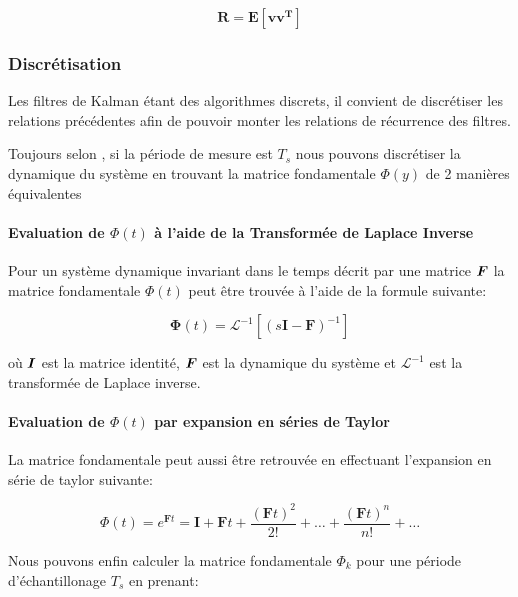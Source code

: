 \documentclass[12pt,a4paper]{report}
\begin{document}
	\begin{equation}
		\label{eq:covmesur_cont}
		\boldsymbol{R = E[vv^T]}
	\end{equation}
	
	\subsubsection{Discrétisation}
	Les filtres de Kalman étant des algorithmes discrets, il convient de discrétiser les relations précédentes afin de pouvoir monter les relations de récurrence des filtres.
	
	\para Toujours selon \cite{zarchan_fundamentals_2009}, si la période de mesure est $T_s$ nous pouvons discrétiser la dynamique du système en trouvant la matrice fondamentale $\Phi(y)$ de 2 manières équivalentes
	
	\paragraph*{Evaluation de $\Phi(t)$ à l'aide de la Transformée de Laplace Inverse}
	
	\para Pour un système dynamique invariant dans le temps décrit par une matrice $\boldsymbol{F}$ la matrice fondamentale $\Phi(t)$ peut être trouvée à l'aide de la formule suivante:
	
	\begin{equation}
	\boldsymbol \Phi(t) =  \mathcal{L}^{-1}[(s\boldsymbol{I-F})^{-1}]
	\end{equation}
	
	\para où $\boldsymbol{I}$ est la matrice identité, $\boldsymbol{F}$ est la dynamique du système et $\mathcal{L}^{-1}$ est la transformée de Laplace inverse.
	
	\paragraph*{Evaluation de $\Phi(t)$ par expansion en séries de Taylor}
	\para La matrice fondamentale peut aussi être retrouvée en effectuant l'expansion en série de taylor suivante:
	
	\begin{equation}
	 \Phi(t) = e^{\boldsymbol Ft} = \boldsymbol I + \boldsymbol Ft + \frac{(\boldsymbol Ft)^2}{2!} + \dots + \frac{(\boldsymbol Ft)^n}{n!} + \dots
	\end{equation}
	
	\para Nous pouvons enfin calculer la matrice fondamentale $\Phi_k$ pour une période d'échantillonage $T_s$ en prenant:
	
\end{document}
